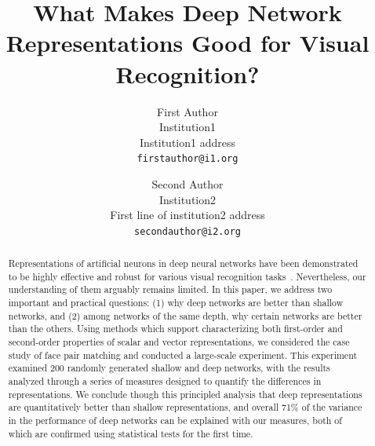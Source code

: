 \documentclass[10pt,twocolumn,letterpaper]{article}
\begin{document}
\title{What Makes Deep Network Representations Good for Visual Recognition?}

\author{First Author\\
Institution1\\
Institution1 address\\
{\tt\small firstauthor@i1.org}
\and
Second Author\\
Institution2\\
First line of institution2 address\\
{\tt\small secondauthor@i2.org}
}

\maketitle

\begin{abstract}

Representations of artificial neurons in deep neural networks have been demonstrated to be highly effective and robust for various visual recognition tasks~\cite{krizhevsky2012imagenet, sermanet2013overfeat, donahue2014decaf}.
Nevertheless, our understanding of them arguably remains limited.
In this paper, we address two important and practical questions: (1) why deep networks are better than shallow networks, and (2) among networks of the same depth, why certain networks are better than the others. Using methods which support characterizing both first-order and second-order properties of scalar and vector representations, we considered the case study of face pair matching and conducted a large-scale experiment. This experiment examined 200 randomly generated shallow and deep networks, with the results analyzed through a series of measures designed to quantify the differences in representations. 
We conclude though this principled analysis that deep representations are quantitatively better than shallow representations, and overall 71\% of the variance in the performance of deep networks can be explained with our measures, both of which are confirmed using statistical tests for the first time.


\end{abstract}
\end{document}
